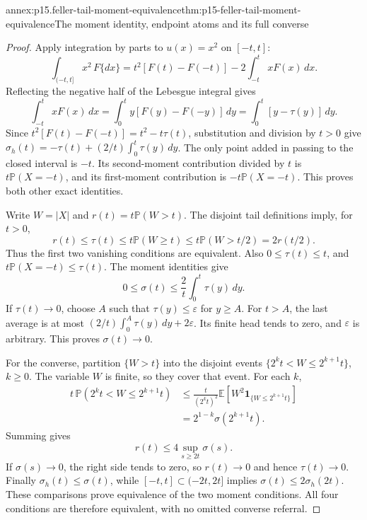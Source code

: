 \begin{annexitem}{annex:p15.feller-tail-moment-equivalence}{thm:p15-feller-tail-moment-equivalence}{The moment identity, endpoint atoms and its full converse}
\begin{proof}
Apply integration by parts to \(u(x)=x^2\) on \([-t,t]\):
\[
 \int_{(-t,t]}x^2\,F\{dx\}
 =t^2[F(t)-F(-t)]-2\int_{-t}^t xF(x)\,dx.
\]
Reflecting the negative half of the Lebesgue integral gives
\[
 \int_{-t}^t xF(x)\,dx
   =\int_0^t y[F(y)-F(-y)]\,dy
   =\int_0^t[y-\tau(y)]\,dy.
\]
Since \(t^2[F(t)-F(-t)]=t^2-t\tau(t)\), substitution and
division by \(t>0\) give
\(\sigma_h(t)=-\tau(t)+(2/t)\int_0^t\tau(y)\,dy\).
The only point added in passing to the closed interval is \(-t\).
Its second-moment contribution divided by \(t\) is
\(t\mathbb P(X=-t)\), and its first-moment contribution is
\(-t\mathbb P(X=-t)\). This proves both other exact identities.

Write \(W=|X|\) and \(r(t)=t\mathbb P(W>t)\). The disjoint
tail definitions imply, for \(t>0\),
\[
 r(t)\leq\tau(t)\leq t\mathbb P(W\geq t)
                  \leq t\mathbb P(W>t/2)=2r(t/2).
\]
Thus the first two vanishing conditions are equivalent.
Also \(0\leq\tau(t)\leq t\), and
\(t\mathbb P(X=-t)\leq\tau(t)\). The moment identities give
\[
 0\leq\sigma(t)\leq\frac2t\int_0^t\tau(y)\,dy.
\]
If \(\tau(t)\to0\), choose \(A\) such that \(\tau(y)\leq\varepsilon\)
for \(y\geq A\). For \(t>A\), the last average is at most
\((2/t)\int_0^A\tau(y)\,dy+2\varepsilon\).
Its finite head tends to zero, and \(\varepsilon\) is arbitrary.
This proves \(\sigma(t)\to0\).

For the converse, partition \(\{W>t\}\) into the disjoint events
\(\{2^kt<W\leq2^{k+1}t\}\), \(k\geq0\).
The variable \(W\) is finite, so they cover that event.
For each \(k\),
\[
 \begin{aligned}
 t\,\mathbb P(2^kt<W\leq2^{k+1}t)
 &\leq\frac{t}{(2^kt)^2}
                  \mathbb E[W^2\mathbf1_{\{W\leq2^{k+1}t\}}]\\
 &=2^{1-k}\sigma(2^{k+1}t).
 \end{aligned}
\]
Summing gives
\[
 r(t)\leq4\sup_{s\geq2t}\sigma(s).
\]
If \(\sigma(s)\to0\), the right side tends to zero, so \(r(t)\to0\)
and hence \(\tau(t)\to0\).
Finally \(\sigma_h(t)\leq\sigma(t)\), while
\([-t,t]\subset(-2t,2t]\) implies
\(\sigma(t)\leq2\sigma_h(2t)\).
These comparisons prove equivalence of the two moment conditions.
All four conditions are therefore equivalent, with no omitted
converse referral.
\end{proof}
\end{annexitem}

